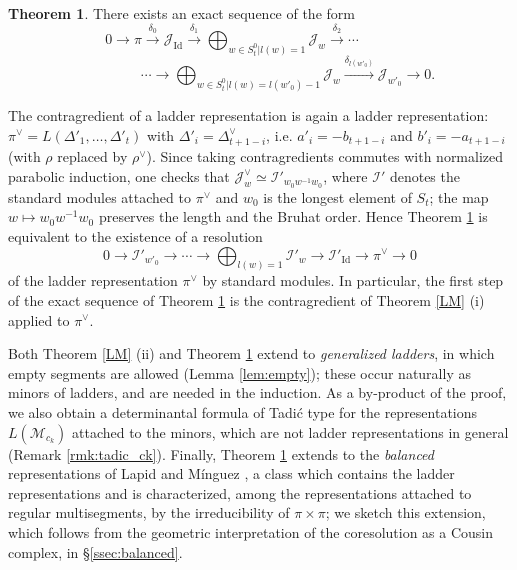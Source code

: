 \documentclass[a4paper,12pt,leqno]{amsart}
\newcommand{\caI}{\mathcal{I}}
\newcommand{\caJ}{\mathcal{J}}
\newcommand{\caM}{\mathcal{M}}
\theoremstyle{plain}
\theoremstyle{definition}
\theoremstyle{definition}
\newtheorem{thmA}{Theorem}
\newcommand{\Id}{\mathrm{Id}}
\begin{document}
\begin{thmA}\label{BGG}
 There exists an exact sequence of the form
\[ 0\longrightarrow \pi \stackrel{\delta_0}{\longrightarrow} \caJ_{\Id}
\stackrel{\delta_1}{\longrightarrow} \bigoplus_{w\in S_t^0 \vert l(w)=1} \caJ_w
\stackrel{\delta_2}{ \longrightarrow} \cdots  \qquad \qquad \]
\[ \qquad \qquad \cdots   \longrightarrow \bigoplus_{w\in S_t^0\vert l(w)=l(w'_0)-1}  \caJ_w
  \stackrel{\delta_{l(w'_0)}}{\longrightarrow} \caJ_{w'_0}\longrightarrow 0.
\]
\end{thmA}

The contragredient of a ladder representation is again a ladder representation:
 $\pi^\vee=L(\Delta'_1,\ldots,\Delta'_t)$ with $\Delta'_i=\Delta^\vee_{t+1-i}$, i.e. $a'_i=-b_{t+1-i}$
 and $b'_i=-a_{t+1-i}$ (with $\rho$ replaced by $\rho^\vee$). Since taking contragredients commutes
  with normalized parabolic induction, one checks that $\caJ_w^\vee\simeq \caI'_{w_0w^{-1}w_0}$,
  where $\caI'$ denotes the standard modules attached to $\pi^\vee$ and $w_0$ is the longest
  element of $S_t$; the map $w\mapsto w_0w^{-1}w_0$ preserves the length and the Bruhat order.
  Hence Theorem \ref{BGG} is equivalent to the existence of a resolution
\[0\rightarrow \caI'_{w'_0}\rightarrow \cdots\rightarrow \bigoplus_{l(w)=1}\caI'_w\rightarrow
\caI'_{\Id}\rightarrow \pi^\vee\rightarrow 0\]
of the ladder representation $\pi^\vee$ by standard modules. In particular, the first step of the
exact sequence of Theorem \ref{BGG} is the contragredient of Theorem \ref{LM} (i) applied to $\pi^\vee$.



Both Theorem \ref{LM} (ii) and Theorem \ref{BGG} extend to \emph{generalized ladders}, in which
empty segments 
are allowed (Lemma \ref{lem:empty}); these occur naturally as minors of ladders, and are needed in
the induction.
 As a by-product of the proof, we also obtain a determinantal formula of Tadi\'c type for the representations 
 $L(\caM_{c_k})$ attached to the minors, which are not ladder representations in general (Remark
 \ref{rmk:tadic_ck}). Finally, Theorem \ref{BGG} extends to the \emph{balanced} representations of
 Lapid and M\'inguez \cite{LM18}, a class which contains the ladder representations and is
 characterized, among the representations attached to regular multisegments, by the irreducibility
 of $\pi\times\pi$; we sketch this extension, which follows from
 the geometric interpretation of the coresolution as a Cousin complex, in \S\ref{ssec:balanced}.
\end{document}
